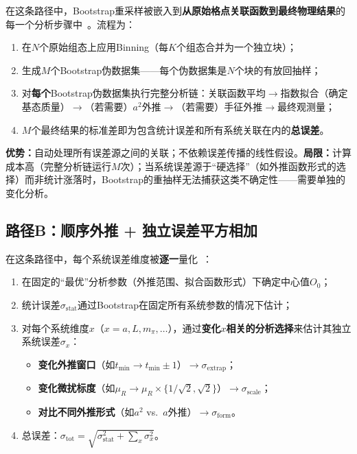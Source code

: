 \documentclass[12pt,a4paper]{ctexart}
\begin{document}
在这条路径中，Bootstrap重采样被嵌入到\textbf{从原始格点关联函数到最终物理结果}的每一个分析步骤中~\cite{GattringerLang2010}。流程为：

\begin{enumerate}[nosep]
    \item 在$N$个原始组态上应用Binning（每$K$个组态合并为一个独立块）；
    \item 生成$M$个Bootstrap伪数据集——每个伪数据集是$N$个块的有放回抽样；
    \item 对\textbf{每个}Bootstrap伪数据集执行完整分析链：关联函数平均$\to$指数拟合（确定基态质量）$\to$（若需要）$a^2$外推$\to$（若需要）手征外推$\to$最终观测量；
    \item $M$个最终结果的标准差即为包含统计误差和所有系统关联在内的\textbf{总误差}。
\end{enumerate}

\textbf{优势：}自动处理所有误差源之间的关联；不依赖误差传播的线性假设。\textbf{局限：}计算成本高（完整分析链运行$M$次）；当系统误差源于``硬选择''（如外推函数形式的选择）而非统计涨落时，Bootstrap的重抽样无法捕获这类不确定性——需要单独的变化分析。

\subsection{路径B：顺序外推 + 独立误差平方相加}

在这条路径中，每个系统误差维度被\textbf{逐一}量化~\cite{GattringerLang2010,Chen2025gluon}：

\begin{enumerate}[nosep]
    \item 在固定的``最优''分析参数（外推范围、拟合函数形式）下确定中心值$O_0$；
    \item 统计误差$\sigma_{\text{stat}}$通过Bootstrap在固定所有系统参数的情况下估计；
    \item 对每个系统维度$x$（$x = a, L, m_\pi, \dots$），通过\textbf{变化$x$相关的分析选择}来估计其独立系统误差$\sigma_x$：
    \begin{itemize}[nosep]
        \item \textbf{变化外推窗口}（如$t_{\min} \to t_{\min} \pm 1$）$\to \sigma_{\text{extrap}}$；
        \item \textbf{变化微扰标度}（如$\mu_R \to \mu_R \times \{1/\sqrt{2}, \sqrt{2}\}$）$\to \sigma_{\text{scale}}$；
        \item \textbf{对比不同外推形式}（如$a^2$ vs.\ $a$外推）$\to \sigma_{\text{form}}$。
    \end{itemize}
    \item 总误差：$\sigma_{\text{tot}} = \sqrt{\sigma_{\text{stat}}^2 + \sum_x \sigma_x^2}$。
\end{enumerate}
\end{document}
